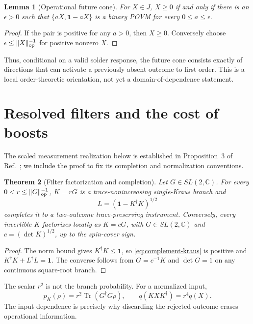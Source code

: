 \documentclass[11pt]{article}
\newtheorem{theorem}{Theorem}[section]
\newtheorem{lemma}[theorem]{Lemma}
\theoremstyle{remark}
\newcommand{\Tr}{\operatorname{Tr}}
\newcommand{\id}{\mathbf 1}
\begin{document}
\begin{lemma}[Operational future cone]
\label{lem:activation}
For $X\in J$, $X\geq0$ if and only if there is an $\epsilon>0$ such that
$\{aX,\id-aX\}$ is a binary POVM for every $0\leq a\leq\epsilon$.
\end{lemma}

\begin{proof}
If the pair is positive for any $a>0$, then $X\geq0$.  Conversely choose
$\epsilon\leq\|X\|_{\rm op}^{-1}$ for positive nonzero $X$.
\end{proof}

Thus, conditional on a valid solder response, the future cone consists exactly of
directions that can activate a previously absent outcome to first order.  This is a local
order-theoretic orientation, not yet a domain-of-dependence statement.

\section{Resolved filters and the cost of boosts}

The scaled measurement realization below is established in Proposition~3 of Ref.~\cite{ArrighiPatricotLorentz}; we include the proof to fix its completion and normalization conventions.

\begin{theorem}[Filter factorization and completion]
\label{thm:filter-lift}
Let $G\in SL(2,\mathbb C)$.  For every
$0<r\leq\|G\|_{\rm op}^{-1}$, $K=rG$ is a trace-nonincreasing single-Kraus branch and
\begin{equation}
 L=(\id-K^\dagger K)^{1/2}
 \label{eq:complement-kraus}
\end{equation}
completes it to a two-outcome trace-preserving instrument.  Conversely, every invertible
$K$ factorizes locally as $K=cG$, with $G\in SL(2,\mathbb C)$ and
$c=(\det K)^{1/2}$, up to the spin-cover sign.
\end{theorem}

\begin{proof}
The norm bound gives $K^\dagger K\leq\id$, so \eqref{eq:complement-kraus} is positive and
$K^\dagger K+L^\dagger L=\id$.  The converse follows from
$G=c^{-1}K$ and $\det G=1$ on any continuous square-root branch.
\end{proof}

The scalar $r^2$ is not the branch probability.  For a normalized input,
\begin{equation}
 p_K(\rho)=r^2\Tr(G^\dagger G\rho),
 \qquad q(KXK^\dagger)=r^4q(X).
 \label{eq:filter-probability}
\end{equation}
The input dependence is precisely why discarding the rejected outcome erases operational
information.
\end{document}
